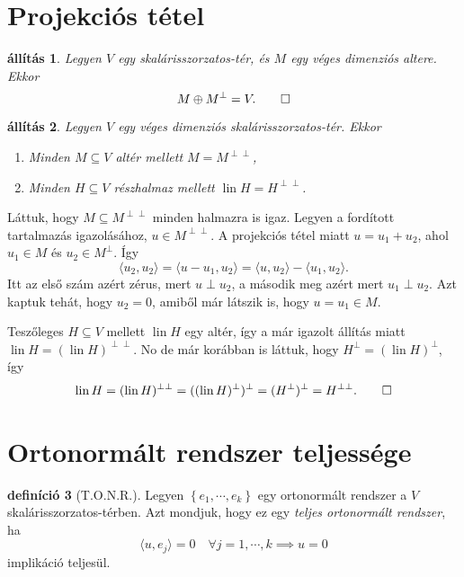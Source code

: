 \documentclass[9pt, a4paper, showtrims]{memoir}
\makeatletter
\renewenvironment{proof}[1][\proofname]
    {\par\pushQED{\qed}%
    \normalfont \topsep6\p@\@plus6\p@\relax
    \trivlist
    \item[\hskip\labelsep
        \itshape
    #1\@addpunct{:}]\ignorespaces}
    {\popQED\endtrivlist\@endpefalse}
\theoremstyle{plain}
\newtheorem{proposition}{állítás}[chapter]
\theoremstyle{remark}
\theoremstyle{definition}
\newtheorem{definition}[proposition]{definíció}
\DeclareMathOperator{\lin}{lin}
\newcommand{\ip}[2]{\langle#1,#2\rangle}
\makeatother
\begin{document}
\section{Projekciós tétel}
\begin{proposition}
    Legyen $V$ egy skalárisszorzatos-tér, és $M$ egy véges dimenziós altere.
    Ekkor 
    \[
        M\oplus M^\perp=V.
        \qedhere
    \]
\end{proposition}
\begin{proposition}
    Legyen $V$ egy véges dimenziós skalárisszorzatos-tér.
    Ekkor
    \begin{enumerate}
        \item Minden $M\subseteq V$ altér mellett $M=M^{\perp\perp}$,
        \item Minden $H\subseteq V$ részhalmaz mellett $\lin H=H^{\perp\perp}$.
            \qedhere
    \end{enumerate}
\end{proposition}
\begin{proof}
    Láttuk, hogy $M\subseteq M^{\perp\perp}$ minden halmazra is igaz.
    Legyen a fordított tartalmazás igazolásához,
    $u\in M^{\perp\perp}$.
    A projekciós tétel miatt $u=u_1+u_2$, 
    ahol $u_1\in M$ és $u_2\in M^{\perp}$.
    Így
    \[
        \ip{u_2}{u_2}
        =
        \ip{u-u_1}{u_2}
        =
        \ip{u}{u_2}-\ip{u_1}{u_2}.
    \]
    Itt az első szám azért zérus, mert $u\perp u_2$, a második meg azért mert $u_1\perp u_2$.
    Azt kaptuk tehát, hogy $u_2=0$, amiből már látszik is, hogy $u=u_1\in M$.

    Teszőleges $H\subseteq V$ mellett $\lin H$ egy altér, így a már igazolt állítás miatt
    $\lin H=(\lin H)^{\perp\perp}$. No de már korábban is láttuk, hogy 
    $H^{\perp}=(\lin H)^\perp$, így 
    \[
        \lin H
        =
        (\lin H)^{\perp\perp}
        =
        ((\lin H)^\perp)^\perp=(H^{\perp})^\perp=H^{\perp\perp}.
        \qedhere
    \]
\end{proof}

\section{Ortonormált rendszer teljessége}
\begin{definition}[T.O.N.R.]
    Legyen $\left\{ e_1,\cdots,e_k \right\}$ egy ortonormált rendszer a $V$ skalárisszorzatos-térben.
    Azt mondjuk, hogy ez egy \emph{teljes ortonormált rendszer}, ha
    \[
        \ip{u}{e_j}=0\quad\forall j=1,\cdots,k \implies u=0
    \]
    implikáció teljesül.
\end{definition}
\end{document}
